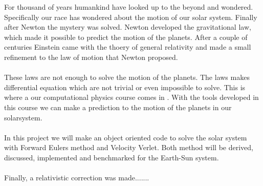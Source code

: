 For thousand of years humankind have looked up to the beyond and wondered. Specifically our race has wondered about the motion of our solar system. Finally after Newton the mystery was solved. Newton developed the gravitational law, which made it possible to predict the motion of the planets. After a couple of centuries Einstein came with the thoery of general relativity and made a small refinement to the law of motion that Newton proposed. 
\\
\\
These laws are not enough to solve the motion of the planets. The laws makes differential equation which are not trivial or even impossible to solve. This is where a our computational physics course comes in . With the tools developed in this course we can make a prediction to the motion of the planets in our solarsystem. 
\\
\\
In this project we will make an object oriented code to solve the solar system with Forward Eulers method and Velocity Verlet. Both method will be derived, discussed, implemented and benchmarked for the Earth-Sun system. 
\\
\\
Finally, a relativistic correction was made....... 
